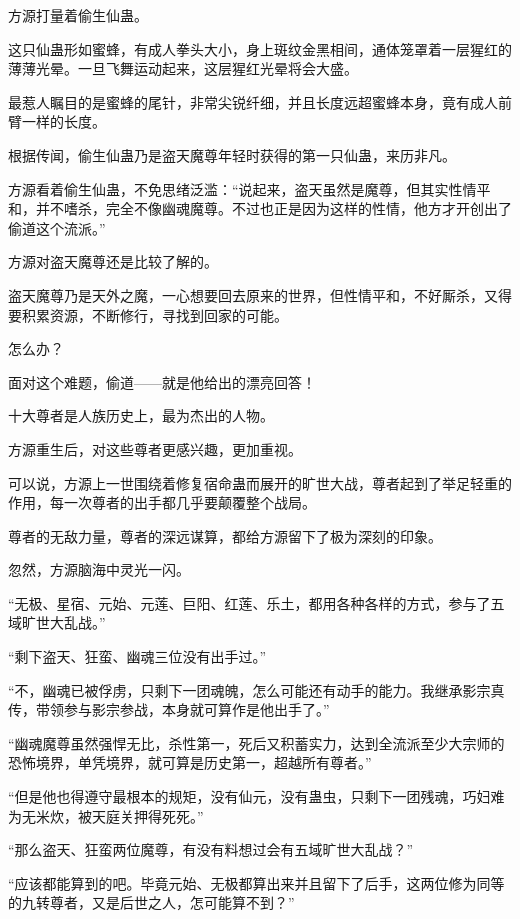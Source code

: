 
\begin{this_body}



方源打量着偷生仙蛊。

这只仙蛊形如蜜蜂，有成人拳头大小，身上斑纹金黑相间，通体笼罩着一层猩红的薄薄光晕。一旦飞舞运动起来，这层猩红光晕将会大盛。

最惹人瞩目的是蜜蜂的尾针，非常尖锐纤细，并且长度远超蜜蜂本身，竟有成人前臂一样的长度。

根据传闻，偷生仙蛊乃是盗天魔尊年轻时获得的第一只仙蛊，来历非凡。

方源看着偷生仙蛊，不免思绪泛滥：“说起来，盗天虽然是魔尊，但其实性情平和，并不嗜杀，完全不像幽魂魔尊。不过也正是因为这样的性情，他方才开创出了偷道这个流派。”

方源对盗天魔尊还是比较了解的。

盗天魔尊乃是天外之魔，一心想要回去原来的世界，但性情平和，不好厮杀，又得要积累资源，不断修行，寻找到回家的可能。

怎么办？

面对这个难题，偷道——就是他给出的漂亮回答！

十大尊者是人族历史上，最为杰出的人物。

方源重生后，对这些尊者更感兴趣，更加重视。

可以说，方源上一世围绕着修复宿命蛊而展开的旷世大战，尊者起到了举足轻重的作用，每一次尊者的出手都几乎要颠覆整个战局。

尊者的无敌力量，尊者的深远谋算，都给方源留下了极为深刻的印象。

忽然，方源脑海中灵光一闪。

“无极、星宿、元始、元莲、巨阳、红莲、乐土，都用各种各样的方式，参与了五域旷世大乱战。”

“剩下盗天、狂蛮、幽魂三位没有出手过。”

“不，幽魂已被俘虏，只剩下一团魂魄，怎么可能还有动手的能力。我继承影宗真传，带领参与影宗参战，本身就可算作是他出手了。”

“幽魂魔尊虽然强悍无比，杀性第一，死后又积蓄实力，达到全流派至少大宗师的恐怖境界，单凭境界，就可算是历史第一，超越所有尊者。”

“但是他也得遵守最根本的规矩，没有仙元，没有蛊虫，只剩下一团残魂，巧妇难为无米炊，被天庭关押得死死。”

“那么盗天、狂蛮两位魔尊，有没有料想过会有五域旷世大乱战？”

“应该都能算到的吧。毕竟元始、无极都算出来并且留下了后手，这两位修为同等的九转尊者，又是后世之人，怎可能算不到？”


\end{this_body}
